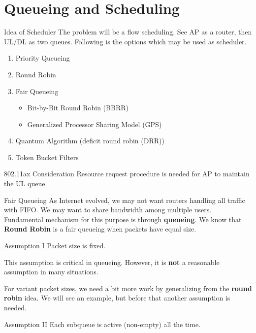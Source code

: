 \documentclass[10pt]{beamer}
\begin{document}
\section{Queueing and Scheduling}
\begin{frame}{Idea of Scheduler}
The problem will be a flow scheduling. See AP as a router, then UL/DL as two queues. 
Following is the options which may be used as scheduler. 
\begin{enumerate}
\item 
	Priority Queueing
\item Round Robin
\item Fair Queueing\\
\begin{itemize}
	\item
	Bit-by-Bit Round Robin (BBRR)
	\item
	Generalized Processor Sharing Model (GPS)
\end{itemize}
\item 
	Quantum Algorithm (deficit round robin (DRR))
\item
	Token Bucket Filters
\end{enumerate}
\alert{802.11ax Consideration} Resource request procedure is needed for AP to maintain the UL queue. 
\end{frame}


\begin{frame}{Fair Queueing}
As Internet evolved, we may not want routers handling all traffic with FIFO. 
We may want to share bandwidth among multiple users.
Fundamental mechanism for this purpose is through \textbf{queueing}.
We know that \textbf{Round Robin} is a fair queueing when packets have equal size.
\begin{block}{Assumption I}
Packet size is fixed.
\end{block}
This assumption is critical in queueing. However, it is \textbf{not} a reasonable assumption in many situations.

For variant packet sizes, we need a bit more work by generalizing from the \textbf{round robin} idea. 
We will see an example, but before that another assumption is needed.
\begin{block}{Assumption II}
Each subqueue is active (non-empty) all the time.
\end{block} 
\end{frame}
\end{document}
